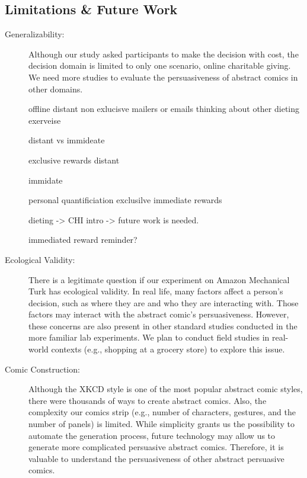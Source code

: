 \subsection{Limitations & Future Work}
\begin{description}
 \item[Generalizability:]  Although our study asked participants to make the decision with cost, the decision domain is limited to only one scenario, online charitable giving. We need more studies to evaluate the persuasiveness of abstract comics in other domains.
 
 offline distant non exlucisve mailers or emails 
 thinking about other dieting exerveise 
 
 distant vs immideate 
 
 exclusive rewards distant
 
 immidate 
 
 personal quantificiation 
 exclusilve immediate rewards
 
 dieting -> CHI intro -> future work is needed. 
 
 immediated reward reminder?

 \item[Ecological Validity:] There is a legitimate question if our experiment on Amazon Mechanical Turk has ecological validity.  In real life, many factors affect a person's decision, such as where they are and who they are interacting with. Those factors may interact with the abstract comic's persuasiveness. However, these concerns are also present in other standard studies conducted in the more familiar lab experiments. We plan to conduct field studies in real-world contexts (e.g., shopping at a grocery store) to explore this issue.
  
 \item[Comic Construction:] Although the XKCD style is one of the most popular abstract comic styles, there were thousands of ways to create abstract comics. Also, the complexity our comics strip (e.g., number of characters, gestures, and the number of panels) is limited. While simplicity grants us the possibility to automate the generation process, future technology may allow us to generate more complicated persuasive abstract comics. Therefore, it is valuable to understand the persuasiveness of other abstract persuasive comics.
\end{description}
